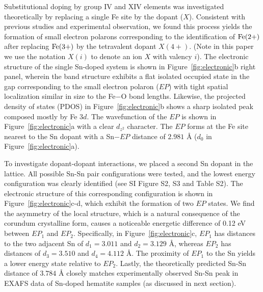 Substitutional doping by group IV and XIV elements was investigated theoretically by replacing a single Fe site by the dopant ($X$). Consistent with previous studies \cite{smart2017effect,zhou2015understanding} and experimental observation,\cite{ling2011sn,li2017morphology} we found this process yields the formation of small electron polarons corresponding to the identification of $\rm Fe (2+)$ after replacing $\rm Fe (3+)$ by the tetravalent dopant $X (4+)$. (Note in this paper we use the notation $X (i)$ to denote an ion $X$ with valency $i$). The electronic structure of the single Sn-doped system is shown in Figure~\ref{fig:electronic}b right panel, wherein the band structure exhibits a flat isolated occupied state in the gap corresponding to the small electron polaron ($EP$) with tight spatial localization similar in size to the Fe$-$O bond lengths. Likewise, the projected density of states (PDOS) in Figure~\ref{fig:electronic}b shows a sharp isolated peak composed mostly by Fe $3d$. The wavefunction of the $EP$ is shown in Figure~\ref{fig:electronic}a with a clear $d_{z^2}$ character. The $EP$ forms at the Fe site nearest to the Sn dopant with a Sn$-EP$ distance of $2.981$ {\AA} ($d_0$ in Figure~\ref{fig:electronic}a).


To investigate dopant-dopant interactions, we placed a second Sn dopant in the lattice. All possible Sn-Sn pair configurations were tested, and the lowest energy configuration was clearly identified (see SI Figure S2, S3 and Table S2). The electronic structure of this corresponding configuration is shown in Figure~\ref{fig:electronic}c-d, which exhibit the formation of two $EP$ states.
We find the asymmetry of the local structure, which %
is a natural consequence of the corundum crystalline form, causes a noticeable energetic difference of 0.12 eV between $EP_1$ and $EP_2$.
Specifically, in Figure~\ref{fig:electronic}c, $EP_1$ has distances to the two adjacent Sn of $d_1=3.011$ and $d_2=3.129$ {\AA}, whereas $EP_2$ has distances of $d_3=3.510$ and $d_4=4.112$ {\AA}. The proximity of $EP_1$ to the Sn yields a lower energy state relative to $EP_2$.
Lastly, the theoretically predicted Sn-Sn distance of $3.784$ {\AA} closely matches experimentally observed Sn-Sn peak in EXAFS data of Sn-doped hematite samples (as discussed in next section).

